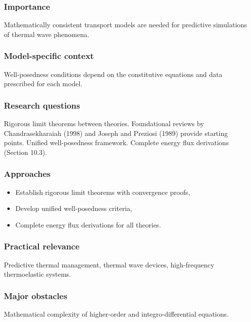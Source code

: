 \subsubsection{Importance}

Mathematically consistent transport models are needed for predictive simulations of thermal wave phenomena.

\subsubsection{Model-specific context}

Well-posedness conditions depend on the constitutive equations and data prescribed for each model.

\subsubsection{Research questions}

Rigorous limit theorems between theories. Foundational reviews by Chandrasekharaiah (1998) \cite{Chandrasekharaiah1998} and Joseph and Preziosi (1989) \cite{Joseph1989} provide starting points. Unified well-posedness framework. Complete energy flux derivations (Section 10.3).

\subsubsection{Approaches}

\begin{itemize}
\item Establish rigorous limit theorems with convergence proofs,
\item Develop unified well-posedness criteria,
\item Complete energy flux derivations for all theories.
\end{itemize}

\subsubsection{Practical relevance}

Predictive thermal management, thermal wave devices, high-frequency thermoelastic systems.

\subsubsection{Major obstacles}

Mathematical complexity of higher-order and integro-differential equations.

